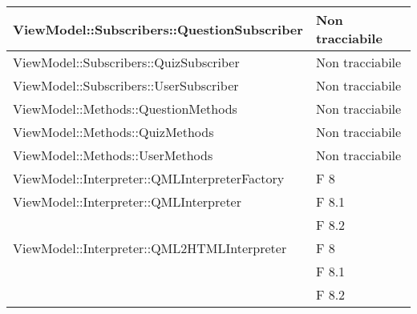 \begin{longtable}{p{}p{}}

\midrule
ViewModel::Subscribers::QuestionSubscriber	& Non tracciabile\\
\midrule
ViewModel::Subscribers::QuizSubscriber	& Non tracciabile\\
\midrule
ViewModel::Subscribers::UserSubscriber	& Non tracciabile\\


\midrule
ViewModel::Methods::QuestionMethods	& Non tracciabile\\
\midrule
ViewModel::Methods::QuizMethods	& Non tracciabile\\
\midrule
ViewModel::Methods::UserMethods	& Non tracciabile\\


\midrule
ViewModel::Interpreter::QMLInterpreterFactory	& F 8\\
												
\midrule
ViewModel::Interpreter::QMLInterpreter	& F 8.1\\
										& F 8.2\\
\midrule
ViewModel::Interpreter::QML2HTMLInterpreter	& F 8\\
											& F 8.1\\
											& F 8.2\\
\midrule
							
	\end{longtable}			
	\newpage